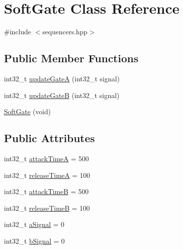 \hypertarget{class_soft_gate}{}\section{Soft\+Gate Class Reference}
\label{class_soft_gate}


{\ttfamily \#include $<$sequencers.\+hpp$>$}

\subsection*{Public Member Functions}
\begin{DoxyCompactItemize}
\item 
int32\+\_\+t \mbox{\hyperlink{class_soft_gate_a47f82e81dc6b987583b5b85cebe331ac}{update\+GateA}} (int32\+\_\+t signal)
\item 
int32\+\_\+t \mbox{\hyperlink{class_soft_gate_a7c535a80ad83086989ef8b2078b0b368}{update\+GateB}} (int32\+\_\+t signal)
\item 
\mbox{\hyperlink{class_soft_gate_a88ebafd53dcc77f9d4dd1226bc3f5ec6}{Soft\+Gate}} (void)
\end{DoxyCompactItemize}
\subsection*{Public Attributes}
\begin{DoxyCompactItemize}
\item 
int32\+\_\+t \mbox{\hyperlink{class_soft_gate_ab177ad0e6de9e59a4da6d7e5ad8bf062}{attack\+TimeA}} = 500
\item 
int32\+\_\+t \mbox{\hyperlink{class_soft_gate_a4e162f5775e4d32ae64dd8d4c5a7b1b9}{release\+TimeA}} = 100
\item 
int32\+\_\+t \mbox{\hyperlink{class_soft_gate_aff0063a006d5b48ebaa84ba98883bb32}{attack\+TimeB}} = 500
\item 
int32\+\_\+t \mbox{\hyperlink{class_soft_gate_ae07c5a6e329100d8667a2ae1526e445d}{release\+TimeB}} = 100
\item 
int32\+\_\+t \mbox{\hyperlink{class_soft_gate_a0470a58330df55dcc5dc976f424a1749}{a\+Signal}} = 0
\item 
int32\+\_\+t \mbox{\hyperlink{class_soft_gate_a1e0a8a95a6bcf0b2598b110f305daeab}{b\+Signal}} = 0
\end{DoxyCompactItemize}
